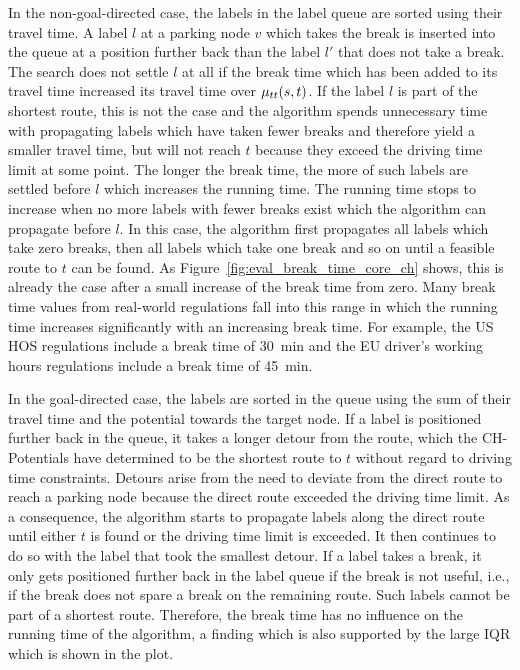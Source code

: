 In the non-goal-directed case, the labels in the label queue are sorted using their travel time. A label $l$ at a parking node $v$ which takes the break is inserted into the queue at a position further back than the label $l'$ that does not take a break. The search does not settle $l$ at all if the break time which has been added to its travel time increased its travel time over $\mu_{tt}(s,t)$. If the label $l$ is part of the shortest route, this is not the case and the algorithm spends unnecessary time with propagating labels which have taken fewer breaks and therefore yield a smaller travel time, but will not reach $t$ because they exceed the driving time limit at some point. The longer the break time, the more of such labels are settled before $l$ which increases the running time. The running time stops to increase when no more labels with fewer breaks exist which the algorithm can propagate before $l$. In this case, the algorithm first propagates all labels which take zero breaks, then all labels which take one break and so on until a feasible route to $t$ can be found. As Figure~\ref{fig:eval_break_time_core_ch} shows, this is already the case after a small increase of the break time from zero. Many break time values from real-world regulations fall into this range in which the running time increases significantly with an increasing break time. For example, the US HOS regulations include a break time of \SI{30}{\minute} and the EU driver's working hours regulations include a break time of \SI{45}{\minute}.

In the goal-directed case, the labels are sorted in the queue using the sum of their travel time and the potential towards the target node. If a label is positioned further back in the queue, it takes a longer detour from the route, which the CH-Potentials have determined to be the shortest route to $t$ without regard to driving time constraints. Detours arise from the need to deviate from the direct route to reach a parking node because the direct route exceeded the driving time limit. As a consequence, the algorithm starts to propagate labels along the direct route until either $t$ is found or the driving time limit is exceeded. It then continues to do so with the label that took the smallest detour. If a label takes a break, it only gets positioned further back in the label queue if the break is not useful, i.e., if the break does not spare a break on the remaining route. Such labels cannot be part of a shortest route. Therefore, the break time has no influence on the running time of the algorithm, a finding which is also supported by the large IQR which is shown in the plot.

